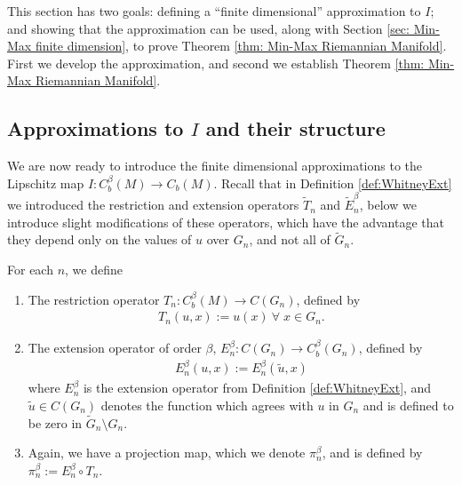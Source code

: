 \documentclass[11pt,reqno]{amsart}
\numberwithin{equation}{section}
\theoremstyle{plain}
\begin{document}
This section has two goals: defining a ``finite dimensional'' approximation to $I$; and showing that the approximation can be used, along with Section \ref{sec: Min-Max finite dimension}, to prove Theorem \ref{thm: Min-Max Riemannian Manifold}.  First we develop the approximation, and second we establish Theorem \ref{thm: Min-Max Riemannian Manifold}.



\subsection{Approximations to $I$ and their structure}\label{sec:ApproximationsIn}


We are now ready to introduce the finite dimensional approximations to the Lipschitz map $I: C^{\beta}_b(M) \to C_b(M)$. Recall that in Definition \ref{def:WhitneyExt} we introduced the restriction and extension operators $\tilde T_n$ and $\tilde E_n^\beta$, below we introduce slight modifications of these operators, which have the advantage that they depend only on the values of $u$ over $G_n$, and not all of $\tilde G_n$.

\begin{DEF}\label{def:WhitneyExtFinite}
  For each $n$, we define
  \begin{enumerate}	
    \item  The restriction operator $T_n:C^\beta_b(M) \to C(G_n)$, defined by
    \begin{align*}	
      T_n(u,x) := u(x)\ \forall\;x\in G_n. 	
    \end{align*}	
    \item The extension operator of order $\beta$, $E_n^\beta:C(G_n) \to C^\beta_b(G_n)$, defined by
    \begin{align*}
      E_n^\beta(u,x) := E_n^\beta(\tilde u,x)		
    \end{align*}				
    where $E_n^\beta$ is the extension operator from Definition \ref{def:WhitneyExt}, and $\tilde u \in C(G_n)$ denotes the function which agrees with $u$ in $G_n$ and is defined to be zero in $\tilde G_n \setminus G_n$.
    \item Again, we have a projection map, which we denote $ \pi_n^\beta$, and is defined by $\pi_n^\beta := E_n^\beta \circ T_n$.
  \end{enumerate}	
\end{DEF}
\end{document}
